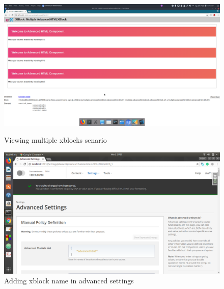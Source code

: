 \begin{figure}[ht]
  \centering
  \includegraphics[width=\textwidth]{images/workbench_2}
  \caption{Viewing multiple xblocks senario}

  \vspace*{\floatsep}

  \includegraphics[width=\textwidth]{images/demo_0}
  \caption{Adding xblock name in advanced settings}
\end{figure}


